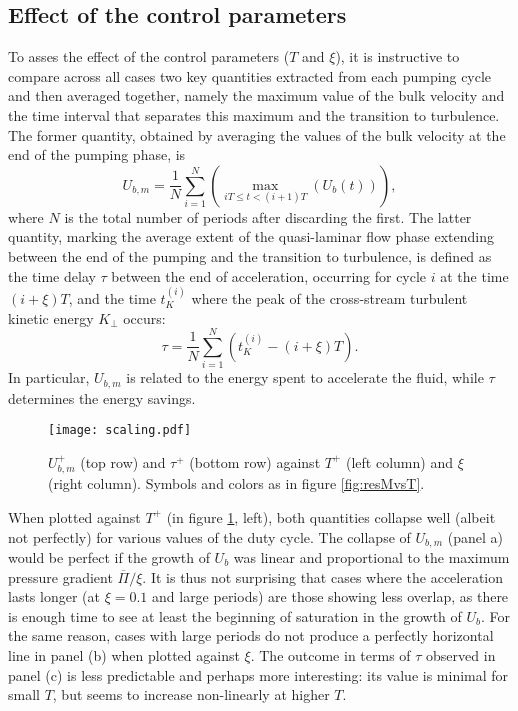 \documentclass[lineno]{jfm}
\begin{document}
\subsection{Effect of the control parameters}

To asses the effect of the control parameters ($T$ and $\xi$), it is instructive to compare across all cases two key quantities extracted from each pumping cycle and then averaged together, namely the maximum value of the bulk velocity and the time interval that separates this maximum and the transition to turbulence.
The former quantity, obtained by averaging the values of the bulk velocity at the end of the pumping phase, is
\[
U_{b,m} = \frac{1}{N}\sum_{i=1}^N \left( \max_{iT\leq t< (i+1)T}{(U_b(t))} \right) ,
\]
where $N$ is the total number of periods after discarding the first. 
The latter quantity, marking the average extent of the quasi-laminar flow phase extending between the end of the pumping and the transition to turbulence, is defined as the time delay $\tau$ between the end of acceleration, occurring for cycle $i$ at the time $(i+\xi)T$, and the time $t_K^{(i)}$ where the peak of the cross-stream turbulent kinetic energy $K_\perp$ occurs:
\[
\tau = \frac{1}{N} \sum_{i=1}^N \left( t_K^{(i)} - (i + \xi) T \right) .
\]
In particular, $U_{b,m}$ is related to the energy spent to accelerate the fluid, while $\tau$ determines the energy savings. 
\begin{figure}
\centering
\texttt{[image: scaling.pdf]}
\caption{$U_{b,m}^+$ (top row) and $\tau^+$ (bottom row) against $T^+$ (left column) and $\xi$ (right column). Symbols and colors as in figure \ref{fig:resMvsT}.}
\label{fig:scaling}
\end{figure}
When plotted against $T^+$ (in figure \ref{fig:scaling}, left), both quantities collapse well (albeit not perfectly) for various values of the duty cycle. The collapse of $U_{b,m}$ (panel a) would be perfect if the growth of $U_b$ was linear and proportional to the maximum pressure gradient $\overline{\Pi} / \xi$. 
It is thus not surprising that cases where the acceleration lasts longer (at $\xi=0.1$ and large periods) are those showing less overlap, as there is enough time to see at least the beginning of saturation in the growth of $U_b$. 
For the same reason, cases with large periods do not produce a perfectly horizontal line in panel (b) when plotted against $\xi$.
The outcome in terms of $\tau$ observed in panel (c) is less predictable and perhaps more interesting: its value is minimal for small $T$, but seems to increase non-linearly at higher $T$. 
\end{document}
